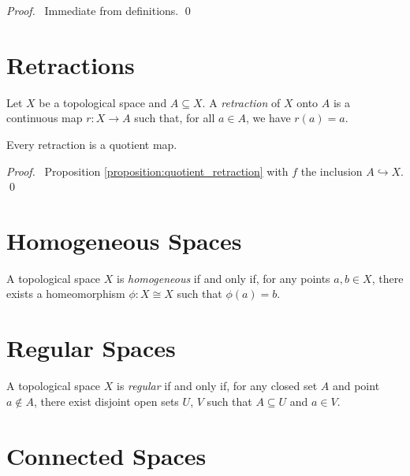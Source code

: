 \begin{proof}
    \pf\ Immediate from definitions. \qed
\end{proof}

\section{Retractions}

\begin{definition}[Retraction]
    Let $X$ be a topological space and $A \subseteq X$. A \emph{retraction} of $X$ onto $A$ is a continuous map $r : X \rightarrow A$ such that, for all $a \in A$,
    we have $r(a) = a$.    
\end{definition}

\begin{proposition}
    Every retraction is a quotient map.
\end{proposition}

\begin{proof}
    \pf\ Proposition \ref{proposition:quotient_retraction} with $f$ the inclusion $A \hookrightarrow X$. \qed
\end{proof}

\section{Homogeneous Spaces}

\begin{definition}[Homogeneous]
    A topological space $X$ is \emph{homogeneous} if and only if, for any
    points $a, b \in X$, there exists a homeomorphism $\phi : X \cong X$
    such that $\phi(a) = b$.
\end{definition}

\section{Regular Spaces}

\begin{definition}
    A topological space $X$ is \emph{regular} if and only if, for any closed set $A$ and point $a \notin A$, there exist disjoint open sets $U$, $V$ such that
    $A \subseteq U$ and $a \in V$.    
\end{definition}

\section{Connected Spaces}

